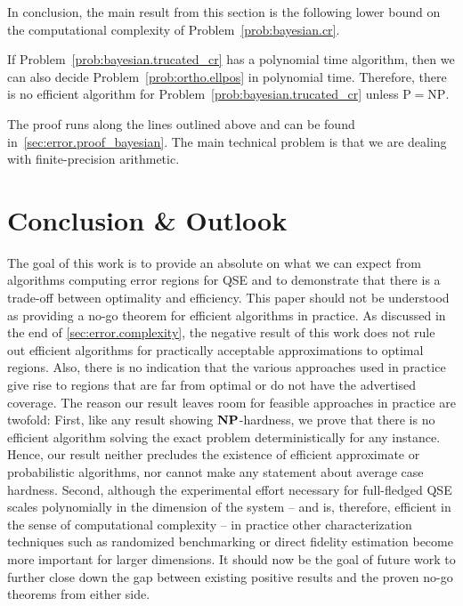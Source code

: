 In conclusion, the main result from this section is the following lower bound on the computational complexity of Problem~\ref{prob:bayesian.cr}.
\begin{theorem}\label{thm:bayesian.hardness}
  If Problem~\ref{prob:bayesian.trucated_cr} has a polynomial time algorithm, then we can also decide Problem~\ref{prob:ortho.ellpos} in polynomial time.
  Therefore, there is no efficient algorithm for Problem~\ref{prob:bayesian.trucated_cr} unless $\mathrm{P} = \mathrm{NP}$.
\end{theorem}

The proof runs along the lines outlined above and can be found in~\ref{sec:error.proof_bayesian}.
The main technical problem is that we are dealing with finite-precision arithmetic.

\section{Conclusion \& Outlook}
\label{sec:error.outlook}

The goal of this work is to provide an absolute  on what we can expect from algorithms computing error regions for QSE and to demonstrate that there is a trade-off between optimality and efficiency.
This paper should not be understood as providing a no-go theorem for efficient algorithms in practice.
As discussed in the end of \cref{sec:error.complexity}, the negative result of this work does not rule out efficient algorithms for practically acceptable approximations to optimal regions.
Also, there is no indication that the various approaches used in practice give rise to regions that are far from optimal or do not have the advertised coverage.
The reason our result leaves room for feasible approaches in practice are twofold:
First, like any result showing $\mathbf{NP}$-hardness, we prove that there is no efficient algorithm solving the exact problem deterministically for any instance.
Hence, our result neither precludes the existence of efficient approximate or probabilistic algorithms, nor cannot make any statement about average case hardness.
Second, although the experimental effort necessary for full-fledged QSE scales polynomially in the dimension of the system -- and is, therefore, efficient in the sense of computational complexity -- in practice other characterization techniques such as randomized benchmarking or direct fidelity estimation become more important for larger dimensions.
It should now be the goal of future work to further close down the gap between existing positive results and the proven no-go theorems from either side.

